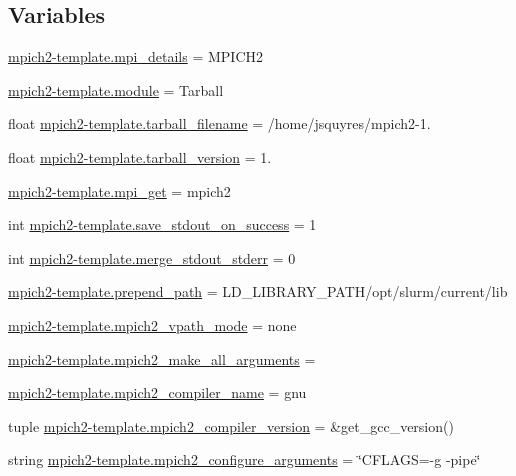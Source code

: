 \subsection*{Variables}
\begin{DoxyCompactItemize}
\item 
\hyperlink{namespacempich2-template_a6b1b1f5d25476fbca270d0985d661274}{mpich2-\/template.\-mpi\-\_\-details} = M\-P\-I\-C\-H2
\item 
\hyperlink{namespacempich2-template_abea5cd73818946f1fc5576eaa63c349e}{mpich2-\/template.\-module} = Tarball
\item 
float \hyperlink{namespacempich2-template_aa946b9eaec8fb25af4f03c7271804090}{mpich2-\/template.\-tarball\-\_\-filename} = /home/jsquyres/mpich2-\/1.
\item 
float \hyperlink{namespacempich2-template_a7ae4515fd7f67881d2edc4db6b0c4199}{mpich2-\/template.\-tarball\-\_\-version} = 1.
\item 
\hyperlink{namespacempich2-template_adbf06848cfab6ca7c02c6403132c0139}{mpich2-\/template.\-mpi\-\_\-get} = mpich2
\item 
int \hyperlink{namespacempich2-template_aae7d34e11fae16b68e0cfd32f9b32044}{mpich2-\/template.\-save\-\_\-stdout\-\_\-on\-\_\-success} = 1
\item 
int \hyperlink{namespacempich2-template_a473952e84102b337ba25c3d8607f4f4f}{mpich2-\/template.\-merge\-\_\-stdout\-\_\-stderr} = 0
\item 
\hyperlink{namespacempich2-template_a6a8f9d4e233a444b8ec50c48c62fc4e4}{mpich2-\/template.\-prepend\-\_\-path} = L\-D\-\_\-\-L\-I\-B\-R\-A\-R\-Y\-\_\-\-P\-A\-T\-H/opt/slurm/current/lib
\item 
\hyperlink{namespacempich2-template_a0f5c02d35394fb0540d3ec8d2d291edf}{mpich2-\/template.\-mpich2\-\_\-vpath\-\_\-mode} = none
\item 
\hyperlink{namespacempich2-template_a46562d5738a372655d9a055eb0feffe5}{mpich2-\/template.\-mpich2\-\_\-make\-\_\-all\-\_\-arguments} =
\item 
\hyperlink{namespacempich2-template_a65f102a602ca4727a803a9fd360d25a6}{mpich2-\/template.\-mpich2\-\_\-compiler\-\_\-name} = gnu
\item 
tuple \hyperlink{namespacempich2-template_a74f41ead1e75cba3e87a1c2901517c19}{mpich2-\/template.\-mpich2\-\_\-compiler\-\_\-version} = \&get\-\_\-gcc\-\_\-version()
\item 
string \hyperlink{namespacempich2-template_a4d2aaae7e07592dc3fce0b0d1b64e1ad}{mpich2-\/template.\-mpich2\-\_\-configure\-\_\-arguments} = \char`\"{}C\-F\-L\-A\-G\-S=-\/g -\/pipe\char`\"{}

\end{DoxyCompactItemize}
